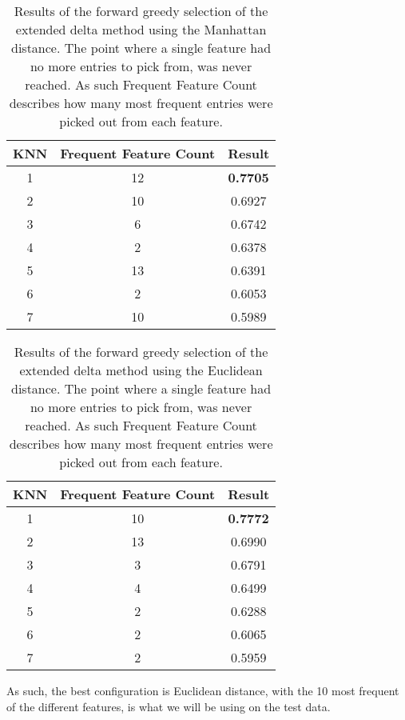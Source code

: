 \begin{table}
\centering
\begin{tabular}{|c|c|c|}
\hline
KNN & Frequent Feature Count & Result          \\ \hline
1   & 12                     & \textbf{0.7705} \\ \hline
2   & 10                     & 0.6927          \\ \hline
3   & 6                      & 0.6742          \\ \hline
4   & 2                      & 0.6378          \\ \hline
5   & 13                     & 0.6391          \\ \hline
6   & 2                      & 0.6053          \\ \hline
7   & 10                     & 0.5989          \\ \hline
\end{tabular}
\caption{Results of the forward greedy selection of the extended delta method
using the Manhattan distance. The point where a single feature had no more
entries to pick from, was never reached. As such Frequent Feature Count
describes how many most frequent entries were picked out from each feature.}
\label{fig:resultsMan}
\end{table}

\begin{table}[]
\centering
\begin{tabular}{|c|c|c|}
\hline
KNN & Frequent Feature Count & Result          \\ \hline
1   & 10                     & \textbf{0.7772} \\ \hline
2   & 13                     & 0.6990          \\ \hline
3   & 3                      & 0.6791          \\ \hline
4   & 4                      & 0.6499          \\ \hline
5   & 2                      & 0.6288          \\ \hline
6   & 2                      & 0.6065          \\ \hline
7   & 2                      & 0.5959          \\ \hline
\end{tabular}
\caption{Results of the forward greedy selection of the extended delta method
using the Euclidean distance. The point where a single feature had no more
entries to pick from, was never reached. As such Frequent Feature Count
describes how many most frequent entries were picked out from each feature.}
\label{fig:resultsEuc}
\end{table}

As such, the best configuration is Euclidean distance, with the 10 most frequent
of the different features, is what we will be using on the test data.
